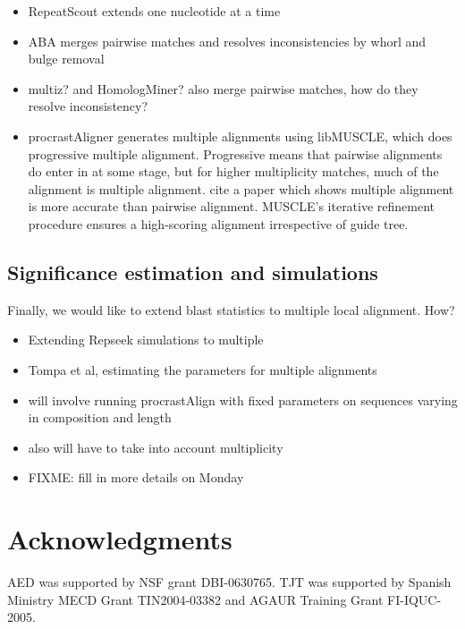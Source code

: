 \documentclass{llncs}
\begin{document}
\begin{itemize}

\item RepeatScout extends one nucleotide at a time
\item ABA merges pairwise matches and resolves inconsistencies by
whorl and bulge removal
\item multiz? and HomologMiner? also merge pairwise matches, how do
they resolve inconsistency?
\item procrastAligner generates multiple alignments using libMUSCLE,
which does progressive multiple alignment.  Progressive means that
pairwise alignments do enter in at some stage, but for higher
multiplicity matches, much of the alignment is multiple alignment.
cite a paper which shows multiple alignment is more accurate than
pairwise alignment.  MUSCLE's iterative refinement procedure ensures
a high-scoring alignment irrespective of guide tree.

\end{itemize}


\subsection{Significance estimation and simulations}

Finally, we would like to extend blast statistics to multiple local alignment. How?
\begin{itemize}
\item Extending Repseek simulations to multiple
\item Tompa et al, estimating the parameters for multiple alignments
\item will involve running procrastAlign with fixed parameters on sequences varying in composition and length
\item also will have to take into account multiplicity
\item FIXME: fill in more details on Monday
\end{itemize}

\section{ Acknowledgments }
AED was supported by NSF grant DBI-0630765. TJT was
supported by Spanish Ministry MECD Grant TIN2004-03382 and AGAUR
Training Grant FI-IQUC-2005.


\small

\end{document}
